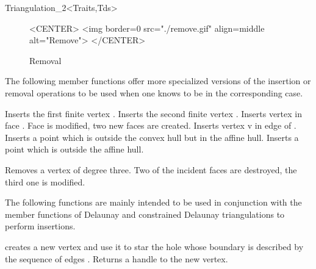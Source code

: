 \begin{ccRefClass}{Triangulation_2<Traits,Tds>}
\begin{figure}
\begin{ccHtmlOnly}
<CENTER>
<img border=0 src="./remove.gif" align=middle alt="Remove">
</CENTER>
\end{ccHtmlOnly}

\caption{Removal
\label{Triangulation_ref_Fig_remove}}
\end{figure}

\begin{ccAdvanced}
The following member functions offer more specialized versions of the
insertion or removal operations to be used when one knows to be in the
corresponding case.

{Inserts the first finite  vertex .}
{Inserts the second finite  vertex .}
 {Inserts vertex  in face
. Face  is modified,
two new faces are created.
}
{Inserts vertex v in edge  of .
}
{Inserts 
 a point which is outside the convex hull  but in the affine hull.
 }
{Inserts 
 a point which is outside the affine hull.}

{Removes a vertex of degree three. Two of the incident faces are destroyed,
the third one is modified.
}

The following functions are mainly intended to be used in conjunction
with the  member functions of Delaunay and constrained 
Delaunay triangulations to perform insertions.

{creates a new vertex  and use it to star the hole 
whose boundary is described  by the sequence of edges \ccc{[edge_begin, 
edge_end[}. Returns a handle to the new vertex.}


\end{ccAdvanced}
\end{ccRefClass}
